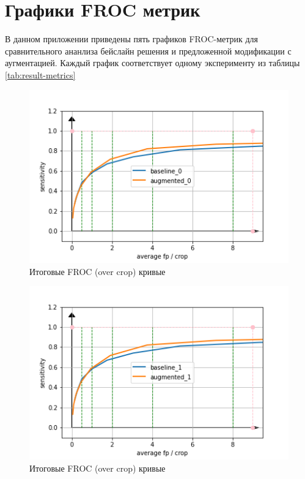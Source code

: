 \chapter{Графики FROC метрик}\label{sec:app:1}

В данном приложении приведены пять графиков FROC-метрик для сравнительного ананлиза бейслайн решения и предложенной модификации с аугментацией. Каждый график соответствует одному эксперименту из таблицы \ref{tab:result-metrics}

\begin{figure}[!h]
\includegraphics[width=\linewidth]{images/froc-results/cv_plot_0.png}
\caption{Итоговые FROC (over crop) кривые}\label{image:final-results-0}
\centering
\end{figure}

\begin{figure}[!h]
\includegraphics[width=\linewidth]{images/froc-results/cv_plot_1.png}
\caption{Итоговые FROC (over crop) кривые}\label{image:final-results-1}
\centering
\end{figure}


